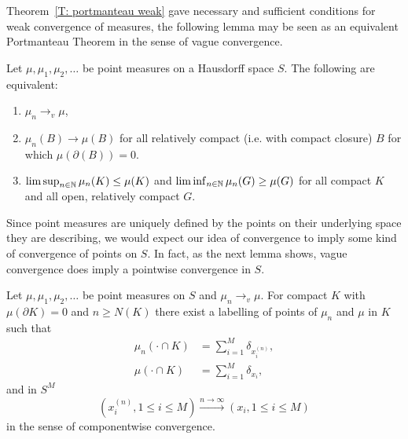 Theorem~\ref{T: portmanteau weak} gave necessary and sufficient conditions for weak convergence of measures,
the following lemma may be seen as an equivalent Portmanteau Theorem in the sense of vague convergence.

\begin{lemma} \label{L: portmanteau vague}
	Let $\mu, \mu_1, \mu_2, \dots$ be point measures on a Hausdorff space $S$.
	The following are equivalent:
	\begin{enumerate}
		\item $\mu_n \rightarrow_v \mu$,
		\item $\mu_n(B) \rightarrow \mu(B)$ for all relatively compact (i.e. with compact closure) $B$ 
			for which $\mu(\partial(B)) = 0$.
		\item $\limsup_{n \in \mathbb{N}}\mu_n(K) \leq \mu(K)$ and $\liminf_{n \in \mathbb{N}}\mu_n(G) \geq \mu(G)$
			for all compact $K$ and all open, relatively compact $G$.
	\end{enumerate}
\end{lemma}

Since point measures are uniquely defined by the points on their underlying space they are describing,
we would expect our idea of convergence to imply some kind of convergence of points on $S$.
In fact, as the next lemma shows, vague convergence does imply a pointwise convergence in $S$.

\begin{lemma} \label{L: pointwise convergence}
	Let $\mu, \mu_1, \mu_2, \dots$ be point measures on $S$ and $\mu_n \rightarrow_v \mu$.
	For compact $K$ with $\mu(\partial K) = 0$ and $n \geq N(K)$
	there exist a labelling of points of $\mu_n$ and $\mu$ in $K$ such that
	\begin{equation}
	\begin{aligned}
		\mu_n(\cdot \cap K) &= \sum_{i=1}^{M} \delta_{x_i^{(n)}}, \\
		\mu(\cdot \cap K) &= \sum_{i=1}^{M} \delta_{x_i},
	\end{aligned}
	\end{equation}
	and in $S^M$
	\begin{equation}
		( x_i^{(n)}, 1 \leq i \leq M ) \xrightarrow{n \rightarrow \infty}
		( x_i, 1 \leq i \leq M  ) 
	\end{equation}
	in the sense of componentwise convergence.
\end{lemma}




